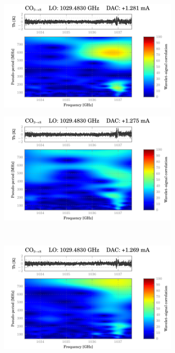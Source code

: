 \begin{figure}
    \centering
    \begin{subfigure}[b]{0.5\textwidth}
        \includegraphics[width=\textwidth]{50015d89_WBS-H-USB_00-09_fit_wavelet}
    \end{subfigure}%
    \hfill
    \begin{subfigure}[b]{0.5\textwidth}
        \includegraphics[width=\textwidth]{50015d89_WBS-H-USB_00-10_fit_wavelet}
    \end{subfigure}%
    \\
    \begin{subfigure}[b]{0.5\textwidth}
        \includegraphics[width=\textwidth]{50015d89_WBS-H-USB_00-11_fit_wavelet}

\end{subfigure}
\end{figure}
